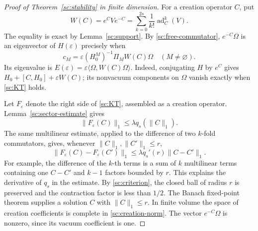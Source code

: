 \begin{proof}[Proof of Theorem~\ref{sc:stability} in finite dimension]
For a creation operator $C$, put
\begin{equation}
 W(C)=e^CVe^{-C}
     =\sum_{k=0}^{2s}\frac{1}{k!}\operatorname{ad}_C^k(V).
 \label{sc:W}
\end{equation}
The equality is exact by Lemma~\ref{sc:support}.
By \eqref{sc:free-commutator}, $e^{-C}\Omega$ is an eigenvector
of $H(\varepsilon)$ precisely when
\begin{equation}
 c_M=\varepsilon(H_0^M)^{-1}\Pi_M W(C)\Omega
 \quad(M\ne\varnothing).
 \label{sc:KT}
\end{equation}
Its eigenvalue is $E(\varepsilon)=\varepsilon\langle\Omega,W(C)\Omega\rangle$.
Indeed, conjugating $H$ by $e^C$ gives
$H_0+[C,H_0]+\varepsilon W(C)$; its nonvacuum components on
$\Omega$ vanish exactly when \eqref{sc:KT} holds.

Let $F_\varepsilon$ denote the right side of \eqref{sc:KT},
assembled as a creation operator. Lemma~\ref{sc:sector-estimate} gives
\begin{equation}
 \|F_\varepsilon(C)\|_1\le\lambda q_s(\|C\|_1).
 \label{sc:F-bound}
\end{equation}
The same multilinear estimate, applied to the difference of two
$k$-fold commutators, gives, whenever $\|C\|_1,\|C'\|_1\le r$,
\begin{equation}
 \|F_\varepsilon(C)-F_\varepsilon(C')\|_1
 \le\lambda q_s'(r)\|C-C'\|_1.
 \label{sc:contraction}
\end{equation}
For example, the difference of the $k$-th terms is a sum of $k$
multilinear terms containing one $C-C'$ and $k-1$ factors bounded
by $r$. This explains the derivative of $q_s$ in the estimate.
By \eqref{sc:criterion}, the closed ball of radius $r$ is preserved
and the contraction factor is less than $1/2$. The Banach fixed-point
theorem supplies a solution $C$ with $\|C\|_1\le r$. In finite
volume the space of creation coefficients is complete in
\eqref{sc:creation-norm}. The vector $e^{-C}\Omega$ is nonzero,
since its vacuum coefficient is one.


\end{proof}
